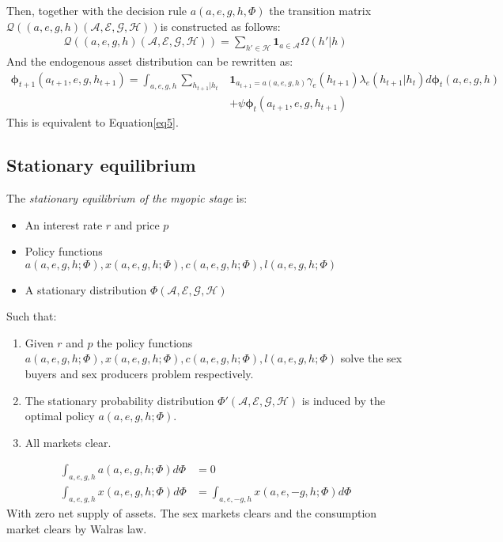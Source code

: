 Then, together with the decision rule $a(a,e,g,h,\Phi)$ the transition matrix $\mathcal{Q}((a,e,g,h)(\mathcal{A,E,G,H}))$is constructed as follows:
\begin{align*}
\mathcal{Q}((a,e,g,h)(\mathcal{A,E,G,H}))=\sum_{h'\in \mathcal{H}}\textbf{1}_{a\in \mathcal{A}} \Omega(h'|h)
\end{align*} 
And the endogenous asset distribution can be rewritten as: 
\begin{align}
\boldsymbol{\phi}_{t+1}(a_{t+1},e,g,h_{t+1})=\int_{a,e,g,h}\sum_{h_{t+1}|h_{t}}&\textbf{1}_{a_{t+1}=a(a,e,g,h)}\gamma_{e}(h_{t+1})\lambda_{e}(h_{t+1}|h_{t})d \boldsymbol{\phi}_{t}(a,e,g,h) \nonumber\\
&+\psi\boldsymbol{\phi}_{t}(a_{t+1},e,g,h_{t+1})
\end{align} 
This is equivalent to Equation\ref{eq5}.
 
 \subsection*{Stationary equilibrium}
 The \textit{stationary equilibrium of the myopic stage} is:
 \begin{itemize}
 \item An interest rate $r$ and price $p$
 \item Policy functions $a(a,e,g,h;\Phi), x(a,e,g,h;\Phi), c(a,e,g,h;\Phi), l(a,e,g,h;\Phi)$
 \item A stationary distribution $\Phi(\mathcal{A},\mathcal{E},\mathcal{G,H})$
 \end{itemize}
 Such that:
 \begin{enumerate}[label=\alph*]
 \item Given $r$ and $p$ the policy functions  $a(a,e,g,h;\Phi), x(a,e,g,h;\Phi), c(a,e,g,h;\Phi), l(a,e,g,h;\Phi)$ solve the sex buyers and sex producers problem respectively. 
 \item The stationary probability distribution $\Phi'(\mathcal{A},\mathcal{E},\mathcal{G,H})$ is induced by the optimal policy $a(a,e,g,h;\Phi)$.
 \item All markets clear. 
  \end{enumerate}
 \begin{align*}
\int_{a,e,g,h} a(a,e,g,h;\Phi) d\Phi &= 0 \\
\int_{a,e,g,h} x(a,e,g,h;\Phi) d \Phi &= \int_{a,e,-g,h} x(a,e,-g,h;\Phi) d\Phi
\end{align*} 
With zero net supply of assets. The sex markets clears and the consumption market clears by Walras law. 

